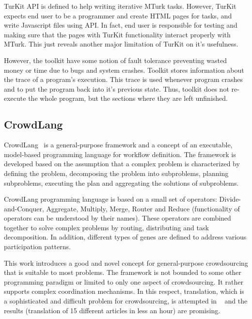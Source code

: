TurKit API is defined to help writing iterative MTurk tasks. However, TurKit expects 
end user to be a programmer and create HTML pages for tasks, and write 
Javascript files using API. In fact, end user is responsible for testing and making 
sure that the pages with TurKit functionality interact properly with MTurk. 
This just reveals another major limitation of TurKit on it's usefulness.

However, the toolkit have some notion of fault tolerance preventing wasted 
money or time due to bugs and system crashes. Toolkit stores information about 
the trace of a program's execution. This trace is used whenever program crashes 
and to put the program back into it's previous state. Thus, toolkit does not 
re-execute the whole program, but the sections where they are left unfinished.


\subsection{CrowdLang}
CrowdLang~\cite{Minder2011} is a general-purpose framework and a concept of 
an executable, model-based programming language for workflow definition. The 
framework is developed based on the assumption that a complex problem is 
characterized by defining the problem, decomposing the problem into subproblems, 
planning subproblems, executing the plan and aggregating the solutions of subproblems.

CrowdLang programming language is based on a small set of operators: 
Divide-and-Conquer, Aggregate, Multiply, Merge, Router and Reduce 
(functionality of operators can be understood by their names). These operators 
are combined together to solve complex problems by routing, distributing and 
task decomposition. In addition, different types of genes are defined to address 
various participation patterns.

This work introduces a good and novel concept for general-purpose crowdsourcing 
that is suitable to most problems. The framework is not bounded to some other 
programming paradigm or limited to only one aspect of crowdsourcing. It rather 
supports complex coordination mechanisms. In this respect, translation, which is a 
sophisticated and difficult problem for crowdsourcing, is attempted in ~\cite{Minder2012} 
and the results (translation of 15 different articles in less an hour) are promising.

